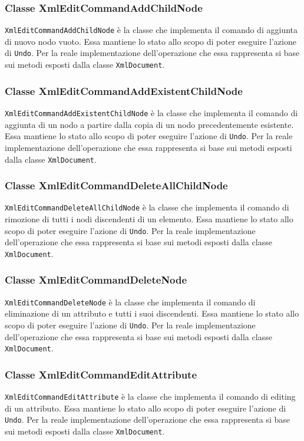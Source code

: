 	\subsubsection{Classe XmlEditCommandAddChildNode}
		\texttt{XmlEditCommandAddChildNode} è la classe che implementa il comando di aggiunta di nuovo nodo vuoto. Essa mantiene lo stato allo scopo di poter eseguire l'azione di \texttt{Undo}. Per la reale implementazione dell'operazione che essa rappresenta si base sui metodi esposti dalla classe \texttt{XmlDocument}.
		
	\subsubsection{Classe XmlEditCommandAddExistentChildNode}
		\texttt{XmlEditCommandAddExistentChildNode} è la classe che implementa il comando di aggiunta di un nodo a partire dalla copia di un nodo precedentemente esistente. Essa mantiene lo stato allo scopo di poter eseguire l'azione di \texttt{Undo}. Per la reale implementazione dell'operazione che essa rappresenta si base sui metodi esposti dalla classe \texttt{XmlDocument}.

	\subsubsection{Classe XmlEditCommandDeleteAllChildNode}
		\texttt{XmlEditCommandDeleteAllChildNode} è la classe che implementa il comando di rimozione di tutti i nodi discendenti di un elemento. Essa mantiene lo stato allo scopo di poter eseguire l'azione di \texttt{Undo}. Per la reale implementazione dell'operazione che essa rappresenta si base sui metodi esposti dalla classe \texttt{XmlDocument}.
			
	\subsubsection{Classe XmlEditCommandDeleteNode}
		\texttt{XmlEditCommandDeleteNode} è la classe che implementa il comando di eliminazione di un attributo e tutti i suoi discendenti. Essa mantiene lo stato allo scopo di poter eseguire l'azione di \texttt{Undo}. Per la reale implementazione dell'operazione che essa rappresenta si base sui metodi esposti dalla classe \texttt{XmlDocument}.
		
	\subsubsection{Classe XmlEditCommandEditAttribute}
		\texttt{XmlEditCommandEditAttribute} è la classe che implementa il comando di editing di un attributo. Essa mantiene lo stato allo scopo di poter eseguire l'azione di \texttt{Undo}. Per la reale implementazione dell'operazione che essa rappresenta si base sui metodi esposti dalla classe \texttt{XmlDocument}.
		
